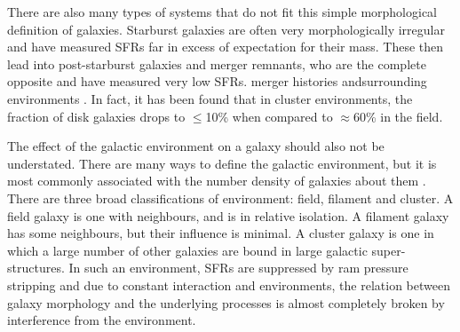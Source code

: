 There are also many types of systems that do not fit this simple morphological definition of galaxies. Starburst galaxies are often very morphologically irregular and have measured SFRs far in excess of expectation for their mass. These then lead into post-starburst galaxies and merger remnants, who are the complete opposite and have measured very low SFRs. \DIFdelbegin {}\DIFdelend \DIFaddbegin {}\DIFaddend merger histories and\DIFaddbegin {}\DIFaddend surrounding environments \citep{2018MNRAS.477.1708P, 2020MNRAS.493.3716H}. In fact, it has been found that in cluster environments, the fraction of disk galaxies drops to $\leq$10\% when compared to $\approx$60\% in the field.

The effect of the galactic environment on a galaxy should also not be understated. There are many ways to define the galactic environment, but it is most commonly associated with the number density of galaxies about them \citep{2003ApJ...585..694E, 2004ApJ...615L.101B}. There are three broad classifications of environment: field, filament and cluster. A field galaxy is one with neighbours, and is in relative isolation. A filament galaxy has some neighbours, but their influence is minimal. A cluster galaxy is one in which a large number of other galaxies are bound in large galactic super-structures. In such an environment, SFRs are suppressed \citep{2006MNRAS.373..469B} by ram pressure stripping and \DIFdelbegin {}\DIFdelend \DIFaddbegin {}\DIFaddend due to constant interaction and \DIFdelbegin {}\DIFdelend \DIFaddbegin {}\DIFaddend environments, the relation between galaxy morphology and the underlying processes is almost completely broken by interference from the environment.

